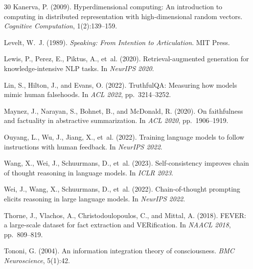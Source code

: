 \documentclass[12pt,a4paper]{article}
\begin{document}
\begin{thebibliography}{30}
Kanerva, P. (2009).
\newblock Hyperdimensional computing: An introduction to computing in distributed representation with high-dimensional random vectors.
\newblock \emph{Cognitive Computation}, 1(2):139--159.

Levelt, W.~J. (1989).
\newblock \emph{Speaking: From Intention to Articulation}.
\newblock MIT Press.

Lewis, P., Perez, E., Piktus, A., et~al. (2020).
\newblock Retrieval-augmented generation for knowledge-intensive NLP tasks.
\newblock In \emph{NeurIPS 2020}.

Lin, S., Hilton, J., and Evans, O. (2022).
\newblock TruthfulQA: Measuring how models mimic human falsehoods.
\newblock In \emph{ACL 2022}, pp.\ 3214--3252.

Maynez, J., Narayan, S., Bohnet, B., and McDonald, R. (2020).
\newblock On faithfulness and factuality in abstractive summarization.
\newblock In \emph{ACL 2020}, pp.\ 1906--1919.

Ouyang, L., Wu, J., Jiang, X., et~al. (2022).
\newblock Training language models to follow instructions with human feedback.
\newblock In \emph{NeurIPS 2022}.

Wang, X., Wei, J., Schuurmans, D., et~al. (2023).
\newblock Self-consistency improves chain of thought reasoning in language models.
\newblock In \emph{ICLR 2023}.

Wei, J., Wang, X., Schuurmans, D., et~al. (2022).
\newblock Chain-of-thought prompting elicits reasoning in large language models.
\newblock In \emph{NeurIPS 2022}.

Thorne, J., Vlachos, A., Christodoulopoulos, C., and Mittal, A. (2018).
\newblock FEVER: a large-scale dataset for fact extraction and VERification.
\newblock In \emph{NAACL 2018}, pp.\ 809--819.

Tononi, G. (2004).
\newblock An information integration theory of consciousness.
\newblock \emph{BMC Neuroscience}, 5(1):42.

\end{thebibliography}
\end{document}
